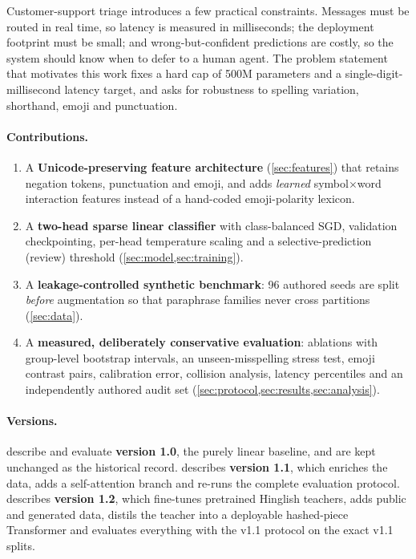 \documentclass[11pt,a4paper]{article}
\theoremstyle{remark}
\begin{document}
Customer-support triage introduces a few practical constraints. Messages must be
routed in real time, so latency is measured in milliseconds; the deployment
footprint must be small; and wrong-but-confident predictions are costly, so
the system should know when to defer to a human agent. The problem
statement that motivates this work fixes a hard cap of 500M parameters and a
single-digit-millisecond latency target, and asks for robustness to spelling
variation, shorthand, emoji and punctuation.

\paragraph{Contributions.}
\begin{enumerate}
  \item A \textbf{Unicode-preserving feature architecture} (\cref{sec:features})
        that retains negation tokens, punctuation and emoji, and adds
        \emph{learned} symbol$\times$word interaction features instead of a
        hand-coded emoji-polarity lexicon.
  \item A \textbf{two-head sparse linear classifier} with class-balanced
        SGD, validation checkpointing, per-head temperature scaling and a
        selective-prediction (review) threshold (\cref{sec:model,sec:training}).
  \item A \textbf{leakage-controlled synthetic benchmark}: 96 authored seeds
        are split \emph{before} augmentation so that paraphrase families never
        cross partitions (\cref{sec:data}).
  \item A \textbf{measured, deliberately conservative evaluation}: ablations
        with group-level bootstrap intervals, an unseen-misspelling stress
        test, emoji contrast pairs, calibration error, collision analysis,
        latency percentiles and an independently authored audit set
        (\cref{sec:protocol,sec:results,sec:analysis}).
\end{enumerate}

\paragraph{Versions.} 
describe and evaluate \textbf{version 1.0}, the purely linear baseline, and
are kept unchanged as the historical record.  describes
\textbf{version 1.1}, which enriches the data, adds a self-attention branch
and re-runs the complete evaluation protocol.  describes
\textbf{version 1.2}, which fine-tunes pretrained Hinglish teachers, adds
public and generated data, distils the teacher into a deployable
hashed-piece Transformer and evaluates everything with the v1.1 protocol on
the exact v1.1 splits.
\end{document}
